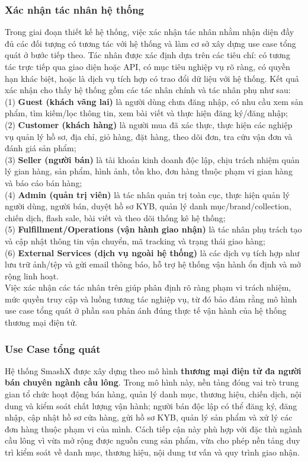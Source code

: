 \documentclass[13pt]{article}
\begin{document}
\subsubsection{Xác nhận tác nhân hệ thống}

Trong giai đoạn thiết kế hệ thống, việc xác nhận tác nhân nhằm nhận diện đầy đủ các đối tượng có tương tác với hệ thống và làm cơ sở xây dựng use case tổng quát ở bước tiếp theo. 
Tác nhân được xác định dựa trên các tiêu chí: có tương tác trực tiếp qua giao diện hoặc API, có mục tiêu nghiệp vụ rõ ràng, có quyền hạn khác biệt, hoặc là dịch vụ tích hợp có trao đổi dữ liệu với hệ thống. 
Kết quả xác nhận cho thấy hệ thống gồm các tác nhân chính và tác nhân phụ như sau: \\
(1) \textbf{Guest (khách vãng lai)} là người dùng chưa đăng nhập, có nhu cầu xem sản phẩm, tìm kiếm/lọc thông tin, xem bài viết và thực hiện đăng ký/đăng nhập; \\
(2) \textbf{Customer (khách hàng)} là người mua đã xác thực, thực hiện các nghiệp vụ quản lý hồ sơ, địa chỉ, giỏ hàng, đặt hàng, theo dõi đơn, tra cứu vận đơn và đánh giá sản phẩm; \\
(3) \textbf{Seller (người bán)} là tài khoản kinh doanh độc lập, chịu trách nhiệm quản lý gian hàng, sản phẩm, hình ảnh, tồn kho, đơn hàng thuộc phạm vi gian hàng và báo cáo bán hàng;\\ 
(4) \textbf{Admin (quản trị viên)} là tác nhân quản trị toàn cục, thực hiện quản lý người dùng, người bán, duyệt hồ sơ KYB, quản lý danh mục/brand/collection, chiến dịch, flash sale, bài viết và theo dõi thống kê hệ thống; \\
(5) \textbf{Fulfillment/Operations (vận hành giao nhận)} là tác nhân phụ trách tạo và cập nhật thông tin vận chuyển, mã tracking và trạng thái giao hàng; \\
(6) \textbf{External Services (dịch vụ ngoài hệ thống)} là các dịch vụ tích hợp như lưu trữ ảnh/tệp và gửi email thông báo, hỗ trợ hệ thống vận hành ổn định và mở rộng linh hoạt. \\
Việc xác nhận các tác nhân trên giúp phân định rõ ràng phạm vi trách nhiệm, mức quyền truy cập và luồng tương tác nghiệp vụ, từ đó bảo đảm rằng mô hình use case tổng quát ở phần sau phản ánh đúng thực tế vận hành của hệ thống thương mại điện tử.
\subsubsection{ Use Case tổng quát}

Hệ thống SmashX được xây dựng theo mô hình \textbf{thương mại điện tử đa người bán chuyên ngành cầu lông}. Trong mô hình này, nền tảng đóng vai trò trung gian tổ chức hoạt động bán hàng, quản lý danh mục, thương hiệu, chiến dịch, nội dung và kiểm soát chất lượng vận hành; người bán độc lập có thể đăng ký, đăng nhập, cập nhật hồ sơ cửa hàng, gửi hồ sơ KYB, quản lý sản phẩm và xử lý các đơn hàng thuộc phạm vi của mình. Cách tiếp cận này phù hợp với đặc thù ngành cầu lông vì vừa mở rộng được nguồn cung sản phẩm, vừa cho phép nền tảng duy trì kiểm soát về danh mục, thương hiệu, nội dung tư vấn và quy trình giao nhận.
\end{document}
